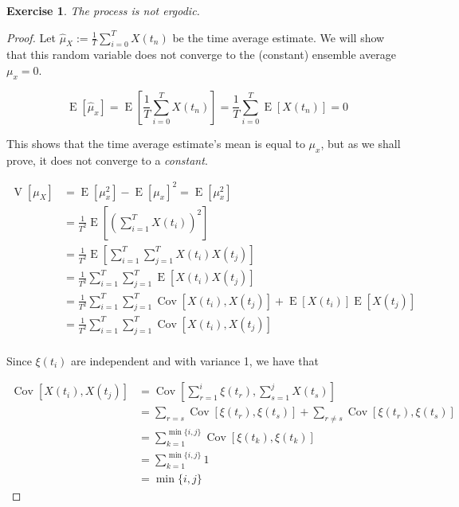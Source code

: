 \documentclass{article}
\DeclareMathOperator{\E}{\mathrm{E}}
\DeclareMathOperator{\V}{\mathrm{V}}
\DeclareMathOperator{\Cov}{\mathrm{Cov}}
\newtheorem{exercise}{Exercise}[section]
\begin{document}
\begin{exercise}
    The process is not ergodic.
\end{exercise}
\begin{proof}
    Let \(\hat\mu_X := \frac{1}{T} \sum_{i=0}^{T} X(t_n)\) be the time average estimate.
    We will show that this random variable does not converge
    to the (constant) ensemble average \(\mu_x = 0\).

    \begin{equation*}
        \E[\hat\mu_x] = \E\left[\frac{1}{T}\sum_{i=0}^{T} X(t_n)\right] = \frac{1}{T}\sum_{i=0}^{T} \E[X(t_n)] = 0
    \end{equation*}

    This shows that the time average estimate's mean is equal to \(\mu_x\), but as we shall prove,
    it does not converge to a \emph{constant}.

    \begin{equation*}
        \begin{split}
            \V[\mu_X] &= \E[\mu_x^2] - \E[\mu_x]^2 = \E[\mu_x^2]\\
            &= \frac{1}{T^2} \E\left[ \left( \sum_{i=1}^T X(t_i )\right)^2 \right]\\
            &= \frac{1}{T^2} \E\left[ \sum_{i=1}^T \sum_{j=1}^T X(t_i) X(t_j) \right]\\
            &= \frac{1}{T^2} \sum_{i=1}^T \sum_{j=1}^T \E[X(t_i) X(t_j)]\\
            &= \frac{1}{T^2} \sum_{i=1}^T \sum_{j=1}^T \Cov[X(t_i), X(t_j)] + \E[X(t_i)] \E[X(t_j)]\\
            &= \frac{1}{T^2} \sum_{i=1}^T \sum_{j=1}^T \Cov[X(t_i), X(t_j)]\\
        \end{split}
    \end{equation*}

    Since \(\xi(t_i)\) are independent and with variance 1, we have that

    \begin{equation*}
        \begin{split}
            \Cov[X(t_i), X(t_j)] &= \Cov[\sum_{r=1}^i \xi(t_r), \sum_{s=1}^j X(t_s)]\\
            &= \sum_{r = s} \Cov[\xi(t_r), \xi(t_s)] + \sum_{r \neq s} \Cov[\xi(t_r), \xi(t_s)]\\
            &= \sum_{k = 1}^{\min\{i, j\}} \Cov[\xi(t_k), \xi(t_k)]\\
            &= \sum_{k = 1}^{\min\{i, j\}} 1\\
            &= \min\{i, j\}
        \end{split}
    \end{equation*}


\end{proof}
\end{document}
